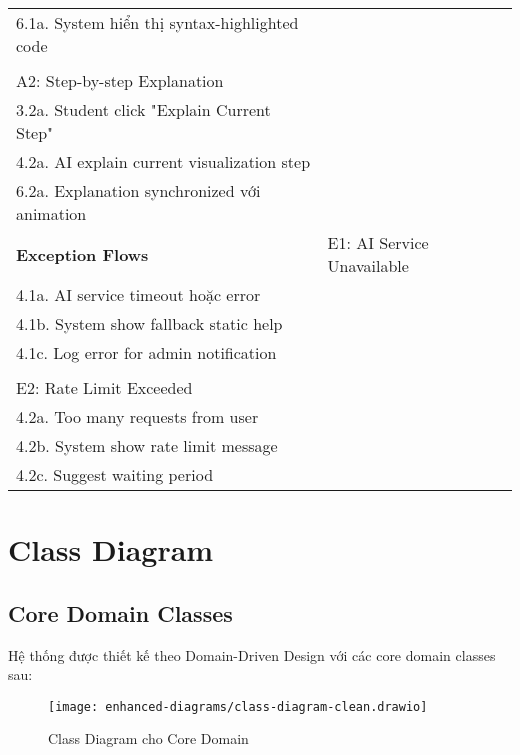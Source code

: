 \begin{table}[H]
\begin{tabularx}{\textwidth}{|l|X|}
\hspace{0.5cm} 6.1a. System hiển thị syntax-highlighted code \\
\\
A2: Step-by-step Explanation \\
\hspace{0.5cm} 3.2a. Student click "Explain Current Step" \\
\hspace{0.5cm} 4.2a. AI explain current visualization step \\
\hspace{0.5cm} 6.2a. Explanation synchronized với animation \\ \hline
\textbf{Exception Flows} & 
E1: AI Service Unavailable \\
\hspace{0.5cm} 4.1a. AI service timeout hoặc error \\
\hspace{0.5cm} 4.1b. System show fallback static help \\
\hspace{0.5cm} 4.1c. Log error for admin notification \\
\\
E2: Rate Limit Exceeded \\
\hspace{0.5cm} 4.2a. Too many requests from user \\
\hspace{0.5cm} 4.2b. System show rate limit message \\
\hspace{0.5cm} 4.2c. Suggest waiting period \\ \hline
\end{tabularx}
\end{table}

\section{Class Diagram}
\label{sec:class-diagram}

\subsection{Core Domain Classes}
\label{subsec:core-classes}

Hệ thống được thiết kế theo Domain-Driven Design với các core domain classes sau:

\begin{figure}[H]
\centering
\texttt{[image: enhanced-diagrams/class-diagram-clean.drawio]}
\caption{Class Diagram cho Core Domain}
\label{fig:class-core}
\end{figure}

